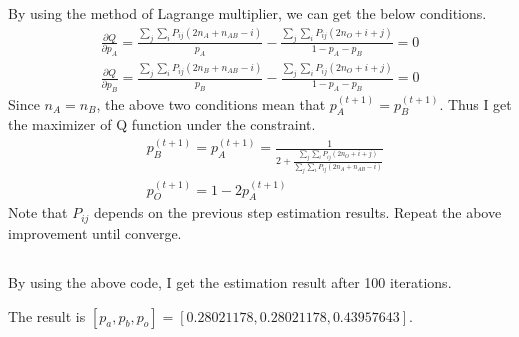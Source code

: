 \documentclass{article}
\begin{document}
		By using the method of Lagrange multiplier, we can get the below conditions.
		\begin{align*}
			\frac{\partial Q}{\partial p_A} = \frac{\sum_j \sum_i P_{ij} (2n_A + n_{AB} -i)}{p_A} - \frac{\sum_j \sum_i P_{ij} (2n_O + i + j)}{1 - p_A - p_B} = 0 \\[10pt]
			\frac{\partial Q}{\partial p_B} = \frac{\sum_j \sum_i P_{ij} (2n_B + n_{AB} -i)}{p_B} - \frac{\sum_j \sum_i P_{ij} (2n_O + i + j)}{1 - p_A - p_B} = 0
		\end{align*}
		Since $n_A = n_B$, the above two conditions mean that $p_A^{(t +1)} = p_B^{(t+1)}$. Thus I get the maximizer of Q function under the constraint.
		\begin{align*}
			&p_B^{(t+1)} = p_A^{(t+1)} = \frac{1}{2 + \frac{\sum_j \sum_i P_{ij} (2n_O + i + j)}{\sum_j \sum_i P_{ij} (2n_A + n_{AB} - i)}}\\[10pt]
			&p_O^{(t+1)} = 1 - 2 p_A^{(t+1)}
		\end{align*}
		Note that $P_{ij}$ depends on the previous step estimation results.
		Repeat the above improvement until converge.
	\subsection{}
	By using the above code, I get the estimation result after 100 iterations. \par The result is $[p_a, p_b, p_o] = [ 0.28021178,  0.28021178,  0.43957643]$.
\section{}
	
\end{document}
